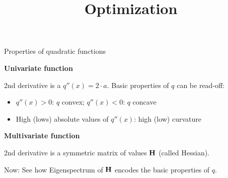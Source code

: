 \documentclass[11pt,compress,t,notes=noshow, xcolor=table]{beamer}
\title{Optimization}
\date{}
\begin{document}
\sloppy


\begin{vbframe}{Properties of quadratic functions}

  \textbf{Univariate function} \vspace*{0.2cm}
  
  2nd derivative is a $q''(x) = 2 \cdot a$. Basic properties of $q$ can be read-off: 
  
  \begin{itemize}
    \item $q''(x) > 0$: $q$ convex; $q''(x) < 0$: $q$ concave
    \item High (lows) absolute values of $q''(x)$: high (low) curvature
  \end{itemize}
  
  \vspace*{0.2cm}
  
  \textbf{Multivariate function}\vspace*{0.2cm}
  
  2nd derivative is a symmetric matrix of values $\bf{H}$ (called Hessian). 
  
  \lz 
  
  Now: See how Eigenspectrum of $\bf{H}$ encodes the basic properties of $q$. 
  
  \end{vbframe}
  
\end{document}
